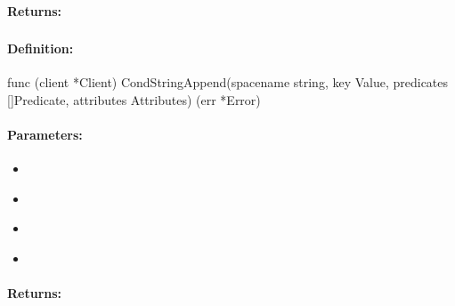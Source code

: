 \paragraph{Returns:}


\pagebreak
\subsubsection{}
\label{api:Go:CondStringAppend}


\paragraph{Definition:}
\begin{gocode}
func (client *Client) CondStringAppend(spacename string, key Value, predicates []Predicate, attributes Attributes) (err *Error)
\end{gocode}

\paragraph{Parameters:}
\begin{itemize}[noitemsep]
\item {}\\

\item {}\\

\item {}\\

\item {}\\

\end{itemize}

\paragraph{Returns:}


\pagebreak
\subsubsection{}
\label{api:Go:GroupStringAppend}


